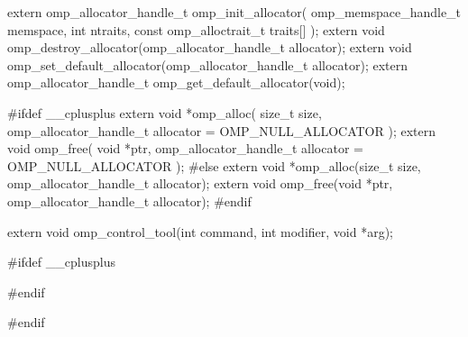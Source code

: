 {\begin{ompcFunction}
{extern omp_allocator_handle_t omp_init_allocator(
  omp_memspace_handle_t memspace,
  int ntraits,
  const omp_alloctrait_t traits[]
);
extern void omp_destroy_allocator(omp_allocator_handle_t allocator);
extern void omp_set_default_allocator(omp_allocator_handle_t allocator);
extern omp_allocator_handle_t omp_get_default_allocator(void);

#ifdef __cplusplus
extern void *omp_alloc(
  size_t size,
  omp_allocator_handle_t allocator = OMP_NULL_ALLOCATOR
);
extern void omp_free(
  void *ptr,
  omp_allocator_handle_t allocator = OMP_NULL_ALLOCATOR
);
#else
extern void *omp_alloc(size_t size, omp_allocator_handle_t allocator);
extern void omp_free(void *ptr, omp_allocator_handle_t allocator);
#endif

extern void omp_control_tool(int command, int modifier, void *arg);

#ifdef __cplusplus
}
#endif

#endif
\end{ompcFunction}} %



